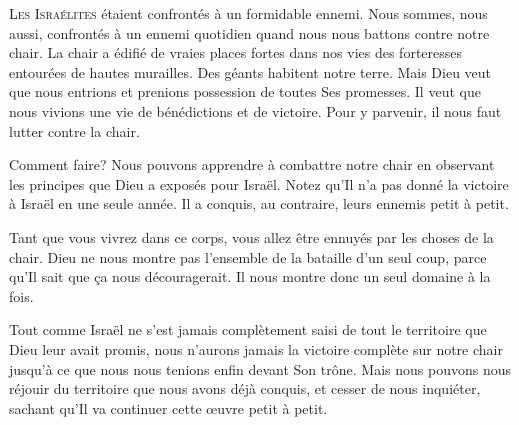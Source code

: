 

\lettrine{L}{es Israélites} étaient confrontés à un formidable ennemi.
 Nous sommes, nous aussi, confrontés à un ennemi quotidien
 quand nous nous battons contre notre chair.
 La chair a édifié de vraies places fortes dans nos vies
 \ocadr{}des forteresses entourées de hautes murailles.
 Des géants habitent notre terre.
 Mais Dieu veut que nous entrions et prenions possession
 de toutes Ses promesses.
 Il veut que nous vivions une vie de bénédictions et de victoire.
 Pour y parvenir, il nous faut lutter contre la chair.

Comment faire? Nous pouvons apprendre à combattre notre chair
 en observant les principes que Dieu a exposés pour Israël.
 Notez qu'Il n'a pas donné la victoire à Israël en une seule année.
 Il a conquis, au contraire, leurs ennemis petit à petit.


Tant que vous vivrez dans ce corps,
 vous allez être ennuyés par les choses de la chair.
 Dieu ne nous montre pas l'ensemble de la bataille d'un seul coup,
 parce qu'Il sait que \c{c}a nous découragerait.
 Il nous montre donc un seul domaine à la fois.

Tout comme Israël ne s'est jamais complètement saisi
 de tout le territoire que Dieu leur avait promis,
 nous n'aurons jamais la victoire complète sur notre chair
 jusqu'à ce que nous nous tenions enfin devant Son trône.
 Mais nous pouvons nous réjouir du territoire que nous avons déjà conquis,
 et cesser de nous inquiéter, sachant qu'Il va continuer cette \oe{}uvre
 \ocadr{}petit à petit. 

\dvrule





